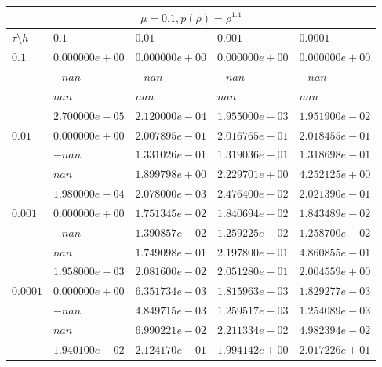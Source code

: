 \documentclass[12pt,a4paper]{article}
\begin{document}
\begin{tabular}{ |l|l|l|l|l| }
    \hline
    \multicolumn{5}{|c|}{$\mu = 0.1, p(\rho)  = \rho^{1.4}$} \\
    \hline
    $\tau\setminus h$ & $0.1$ & $0.01$ & $0.001$ & $0.0001$\\
    \hline
    $0.1$ & $0.000000e+00$ & $0.000000e+00$ & $0.000000e+00$ & $0.000000e+00$ \\
    & $-nan$ & $-nan$ & $-nan$ & $-nan$ \\
    & $nan$ & $nan$ & $nan$ & $nan$ \\
    & $2.700000e-05$ & $2.120000e-04$ & $1.955000e-03$ & $1.951900e-02$ \\
    \hline
    $0.01$ & $0.000000e+00$ & $2.007895e-01$ & $2.016765e-01$ & $2.018455e-01$ \\
    & $-nan$ & $1.331026e-01$ & $1.319036e-01$ & $1.318698e-01$ \\
    & $nan$ & $1.899798e+00$ & $2.229701e+00$ & $4.252125e+00$ \\
    & $1.980000e-04$ & $2.078000e-03$ & $2.476400e-02$ & $2.021390e-01$ \\
    \hline
    $0.001$ & $0.000000e+00$ & $1.751345e-02$ & $1.840694e-02$ & $1.843489e-02$ \\
    & $-nan$ & $1.390857e-02$ & $1.259225e-02$ & $1.258700e-02$ \\
    & $nan$ & $1.749098e-01$ & $2.197800e-01$ & $4.860855e-01$ \\
    & $1.958000e-03$ & $2.081600e-02$ & $2.051280e-01$ & $2.004559e+00$ \\
    \hline
    $0.0001$ & $0.000000e+00$ & $6.351734e-03$ & $1.815963e-03$ & $1.829277e-03$ \\
    & $-nan$ & $4.849715e-03$ & $1.259517e-03$ & $1.254089e-03$ \\
    & $nan$ & $6.990221e-02$ & $2.211334e-02$ & $4.982394e-02$ \\
    & $1.940100e-02$ & $2.124170e-01$ & $1.994142e+00$ & $2.017226e+01$ \\
    \hline
\end{tabular}
\end{document}
